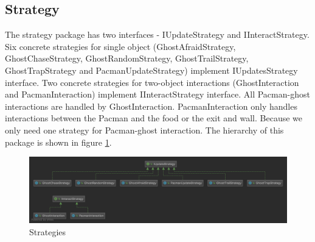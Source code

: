 \documentclass[letterpaper, 11pt]{article}
\begin{document}
\subsection{Strategy}
The strategy package has two interfaces - IUpdateStrategy and IInteractStrategy. Six concrete strategies for single object (GhostAfraidStrategy, GhostChaseStrategy, GhostRandomStrategy, GhostTrailStrategy, GhostTrapStrategy and PacmanUpdateStrategy) implement IUpdatesStrategy interface. Two concrete strategies for two-object interactions (GhostInteraction and PacmanInteraction) implement IInteractStrategy interface. All Pacman-ghost interactions are handled by GhostInteraction. PacmanInteraction only handles interactions between the Pacman and the food or the exit and wall. Because we only need one strategy for Pacman-ghost interaction. The hierarchy of this package is shown in figure \ref{figstrategy}.

\begin{figure}[htbp] 
  \centering
  \includegraphics[width=0.98\linewidth]{strategy.png} 
  \caption{Strategies}
  \label{figstrategy} 
\end{figure}
\end{document}
